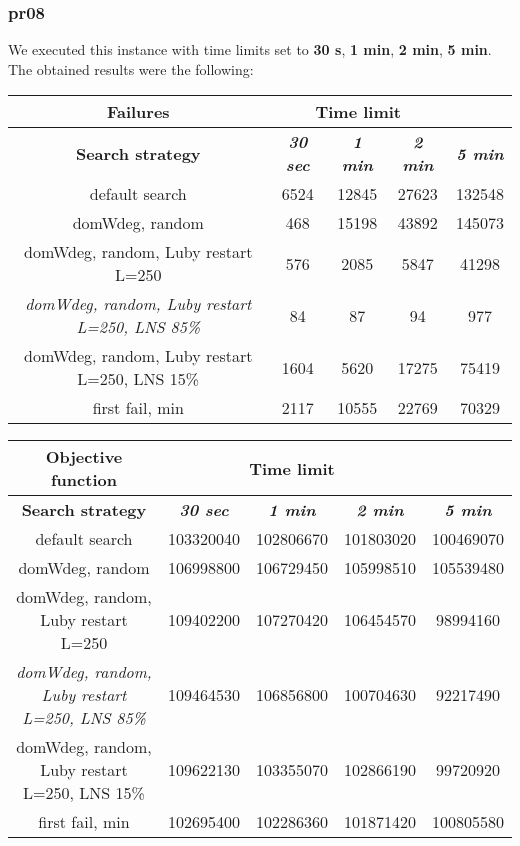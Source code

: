 \subsubsection{pr08}
We executed this instance with time limits set to \textbf{30 s}, \textbf{1 min}, \textbf{2 min}, \textbf{5 min}.\\
The obtained results were the following:
{
\renewcommand{\arraystretch}{2}
\begin{longtable}[h]{| c | c | c | c | c |}
    \hline
    \textbf{Failures} & \multicolumn{3}{c}{Time limit} & \\
    \hline
    \textbf{Search strategy} & \textbf{\textit{30 sec}} & \textbf{\textit{1 min}} & \textbf{\textit{2 min}} & \textbf{\textit{5 min}} \\
    \hline
    \endhead
    default search                                         & 6524 & 12845 &  27623 & 132548 \\
    \hline
    domWdeg, random                                        &  468 & 15198 &  43892 & 145073 \\
    \hline
    domWdeg, random, Luby restart L=250                    &  576 &  2085 &   5847 &  41298 \\
    \hline
    \textit{domWdeg, random, Luby restart L=250, LNS 85\%} &   84 &    87 &     94 &    977 \\
    \hline
    domWdeg, random, Luby restart L=250, LNS 15\%          & 1604 &  5620 &  17275 &  75419 \\
    \hline
    first fail, min                                        & 2117 & 10555 &  22769 &  70329 \\
    \hline
\end{longtable}
}

{
\renewcommand{\arraystretch}{2}
\begin{longtable}[h]{| c | c | c | c | c |}
    \hline
    \textbf{Objective function} & \multicolumn{3}{c}{Time limit} & \\
    \hline
    \textbf{Search strategy} & \textbf{\textit{30 sec}} & \textbf{\textit{1 min}} & \textbf{\textit{2 min}} & \textbf{\textit{5 min}} \\
    \hline
    \endhead
    default search                                         & 103320040 & 102806670 & 101803020 & 100469070 \\
    \hline
    domWdeg, random                                        & 106998800 & 106729450 & 105998510 & 105539480 \\
    \hline
    domWdeg, random, Luby restart L=250                    & 109402200 & 107270420 & 106454570 &  98994160 \\
    \hline
    \textit{domWdeg, random, Luby restart L=250, LNS 85\%} & 109464530 & 106856800 & 100704630 &  92217490 \\
    \hline
    domWdeg, random, Luby restart L=250, LNS 15\%          & 109622130 & 103355070 & 102866190 &  99720920 \\
    \hline
    first fail, min                                        & 102695400 & 102286360 & 101871420 & 100805580 \\
    \hline
\end{longtable}
}